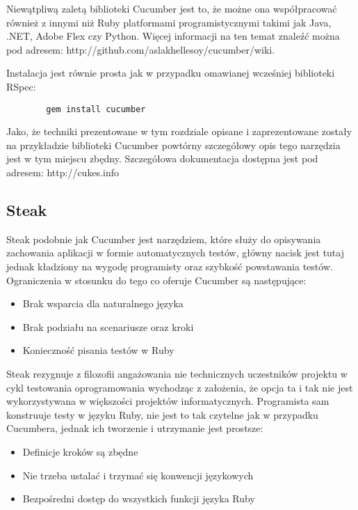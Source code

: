       Niewątpliwą zaletą biblioteki Cucumber jest to, że możne ona współpracować również z innymi niż Ruby platformami programistycznymi takimi jak Java, .NET, Adobe Flex czy Python. Więcej informacji na ten temat znaleźć można pod adresem: http://github.com/aslakhellesoy/cucumber/wiki.
      
      Instalacja jest równie prosta jak w przypadku omawianej wcześniej biblioteki RSpec:
      
      \begin{verbatim}
        gem install cucumber
      \end{verbatim}
      
      Jako, że techniki prezentowane w tym rozdziale opisane i zaprezentowane zostały na przykładzie biblioteki Cucumber powtórny szczegółowy opis tego narzędzia jest w tym miejscu zbędny. Szczegółowa dokumentacja dostępna jest pod adresem: http://cukes.info
      
    \subsection{Steak}
      Steak podobnie jak Cucumber jest narzędziem, które służy do opisywania zachowania aplikacji w formie automatycznych testów, główny nacisk jest tutaj jednak kładziony na wygodę programisty oraz szybkość powstawania testów. Ograniczenia w stosunku do tego co oferuje Cucumber są następujące:
      
      \begin{itemize}
        \item Brak wsparcia dla naturalnego języka
        \item Brak podziału na scenariusze oraz kroki
        \item Konieczność pisania testów w Ruby
      \end{itemize}
      
      Steak rezygnuje z filozofii angażowania nie technicznych uczestników projektu w cykl testowania oprogramowania wychodząc z założenia, że opcja ta i tak nie jest wykorzystywana w większości projektów informatycznych. Programista sam konstruuje testy w języku Ruby, nie jest to tak czytelne jak w przypadku Cucumbera, jednak ich tworzenie i utrzymanie jest prostsze:
      
      \begin{itemize}
        \item Definicje kroków są zbędne
        \item Nie trzeba ustalać i trzymać się konwencji językowych
        \item Bezpośredni dostęp do wszystkich funkcji języka Ruby
      \end{itemize}
      
